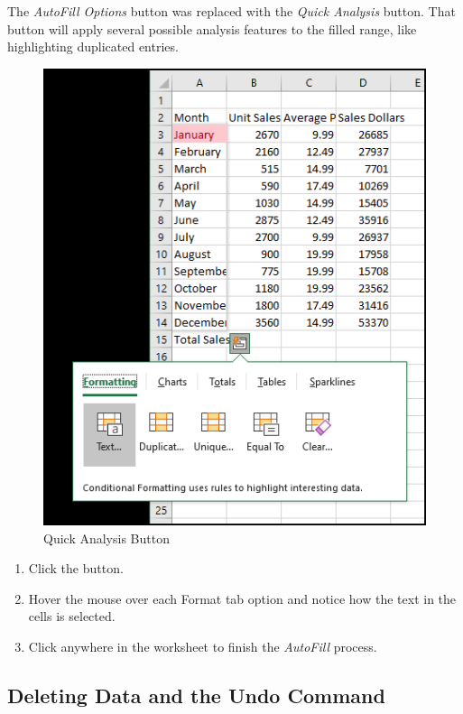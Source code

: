  The \textit{AutoFill Options} button was replaced with the \textit{Quick Analysis} button. That button will apply several possible analysis features to the filled range, like highlighting duplicated entries.

\begin{figure}[H]
	\centering
	\includegraphics[width=\maxwidth{.95\linewidth}]{gfx/ch01_fig20a}
	\caption{Quick Analysis Button}
	\label{01:fig20a}
\end{figure}

\begin{enumbox}
	\begin{enumerate}
		\item Click the  button.
		\item Hover the mouse over each Format tab option and notice how the text in the cells is selected.
		\item Click anywhere in the worksheet to finish the \textit{AutoFill} process.
	\end{enumerate}
\end{enumbox}

\subsection{Deleting Data and the Undo Command}

